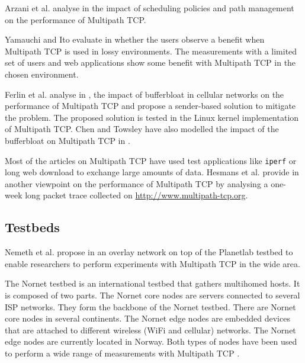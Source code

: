 Arzani et al. analyse in \cite{Arzani_Impact:2014} the impact of scheduling policies and path management on the performance of Multipath TCP. 

Yamauchi and Ito evaluate in \cite{Yamauchi_Web:2014} whether the users observe a benefit when Multipath TCP is used in lossy environments. The measurements with a limited set of users and web applications show some benefit with Multipath TCP in the chosen environment.

Ferlin et al. analyse in \cite{Ferlin_Bufferbloat:2014}, the impact of bufferbloat in cellular networks on the performance of Multipath TCP and propose a sender-based solution to mitigate the problem. The proposed solution is tested in the Linux kernel implementation of Multipath TCP. Chen and Towsley have also modelled the impact of the bufferbloat on Multipath TCP in \cite{Chen_Bufferbloat:2014}.

Most of the articles on Multipath TCP have used test applications like \texttt{iperf} or long web download to exchange large amounts of data. Hesmans et al. provide in \cite{HesmansTMA2015} another viewpoint on the performance of Multipath TCP by analysing a one-week long packet trace collected on \url{http://www.multipath-tcp.org}.

\subsection{Testbeds}

Nemeth et al. propose in \cite{Nemeth_Playground:2013} an overlay network on top of the Planetlab testbed to enable researchers to perform experiments with Multipath TCP in the wide area. 

The Nornet testbed \cite{Gunnar_Nornet:2014,Kvalbein_Nornet:2014} is an international testbed that gathers multihomed hosts. It is composed of two parts. The Nornet core nodes \cite{Gunnar_Nornet:2014} are servers connected to several ISP networks. They form the backbone of the Nornet testbed. There are Nornet core nodes in several continents. The Nornet edge nodes \cite{Kvalbein_Nornet:2014} are embedded devices that are attached to different wireless (WiFi and cellular) networks. The Nornet edge nodes are currently located in Norway. Both types of nodes have been used to perform a wide range of measurements with Multipath TCP \cite{draft-dreibholz-mptcp-nornet-experience}.
